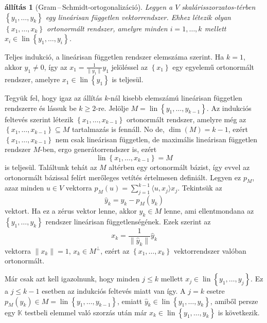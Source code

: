 \documentclass[9pt, a4paper, showtrims]{memoir}
\makeatletter
\renewenvironment{proof}[1][\proofname]
    {\par\pushQED{\qed}%
    \normalfont \topsep6\p@\@plus6\p@\relax
    \trivlist
    \item[\hskip\labelsep
        \itshape
    #1\@addpunct{:}]\ignorespaces}
    {\popQED\endtrivlist\@endpefalse}
\theoremstyle{plain}
\newtheorem{proposition}{állítás}[chapter]
\theoremstyle{remark}
\theoremstyle{definition}
\DeclareMathOperator{\lin}{lin}
\newcommand{\ip}[2]{\langle#1,#2\rangle}
\makeatother
\begin{document}
\begin{proposition}[Gram\,--\,Schmidt-ortogonalizáció]\label{pr:GS}
	Legyen a $V$ skalárisszorzatos-térben $\left\{ y_1,\ldots,y_k \right\}$ egy lineárisan független
	vektorrendszer.
	Ehhez létezik olyan $\left\{ x_1,\ldots,x_k \right\}$ ortonormált rendszer,
	amelyre minden $i=1,\ldots,k$ mellett $x_i\in\lin\left\{ y_1,\ldots,y_i \right\}$.
\end{proposition}
\begin{proof}
	Teljes indukció, a lineárisan független rendszer elemszáma szerint.
	Ha $k=1$, akkor $y_1\neq 0$, így az $x_1=\frac{1}{\|y_1\|}y_1$ jelöléssel az
	$\left\{ x_1 \right\}$ egy egyelemű ortonormált rendszer, amelyre $x_1\in\lin\left\{ y_1 \right\}$ is teljesül.

	Tegyük fel, hogy igaz az állítás $k$-nál kisebb elemszámú lineárisan független rendszerre és lássuk be $k\geq 2$-re.
	Jelölje $M=\lin\left\{ y_1,\ldots,y_{k-1} \right\}$.
	Az indukciós feltevés szerint létezik $\left\{ x_1,\ldots,x_{k-1} \right\}$ ortonormált rendszer,
	amelyre még az
	\begin{math}
		\left\{ x_1,\ldots,x_{k-1} \right\}\subseteq M
	\end{math}
	tartalmazás is fennáll.
	No de, $\dim(M)=k-1$, ezért $\left\{ x_1,\ldots,x_{k-1} \right\}$ nem csak lineárisan független,
	de maximális lineárisan független rendszer $M$-ben, ergo generátorrendszer is, ezért
	\[
		\lin\left\{ x_1,\ldots,x_{k-1} \right\}=M
	\]
	is teljesül.
	Találtunk tehát az $M$ altérben egy ortonormált bázist,
	így evvel az ortonormált bázissal felírt merőleges vetítés értelmesen definiált.
	Legyen ez $p_M$, azaz minden $u\in V$ vektorra $p_M\left( u \right)=\sum_{j=1}^{k-1}\ip{u}{x_j}x_j$.
	Tekintsük az
	\[
		\hat{y}_k=y_k-p_M\left( y_k \right)
	\]
	vektort.
	Ha ez a zérus vektor lenne, akkor $y_k\in M$ lenne, ami ellentmondana az $\left\{ y_1,\ldots,y_k \right\}$ rendszer
	lineárisan függetlenségének.
	Ezek szerint az
	\[
		x_k
		=
		\frac{1}{\|\hat{y}_k\|}\hat{y}_k
	\]
	vektorra $\|x_k\|=1$, $x_k\in M^\perp$, ezért az $\left\{ x_1,\ldots,x_k \right\}$ vektorrendszer valóban ortonormált.

	Már csak azt kell igazolnunk, hogy minden $j\leq k$ mellett $x_j\in\lin\left\{ y_1,\ldots,y_j \right\}$.
	Ez a $j\leq k-1$ esetben az indukciós feltevés miatt van így.
	A $j=k$ esetre $p_M\left( y_k \right)\in M=\lin\left\{ y_1,\ldots,y_{k-1} \right\}$,
	emiatt $\hat{y}_k\in\lin\left\{ y_1,\ldots,y_k \right\}$,
	amiből persze egy $\mathbb{K}$ testbeli elemmel való szorzás után már $x_k\in\lin\left\{ y_1,\ldots,y_k \right\}$ is következik.
\end{proof}
\end{document}
